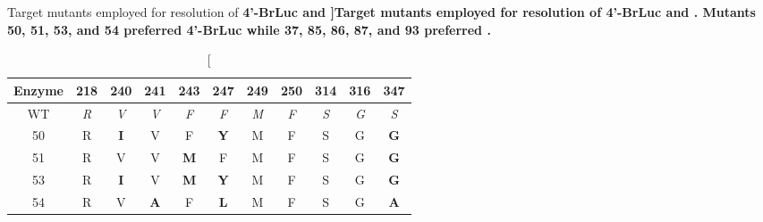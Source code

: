 \begin{table}[]
  \centering
  \caption[Target mutants employed for resolution of \bf{4'-BrLuc} and \dluc{}]{Target mutants employed for resolution of \bf{4'-BrLuc} and \dluc{}. Mutants 50, 51, 53, and 54 preferred \bf{4'-BrLuc} while 37, 85, 86, 87, and 93 preferred \dluc{}.
  }\label{table:Mutants}
  \begin{tabular}{@{}c | cccccccccc@{}}
  \toprule
  Enzyme & 218                               & 240                               & 241                               & 243                               & 247                               & 249                               & 250                               & 314                               & 316                               & 347                               \\ \midrule
  WT     & \textit{R}                        & \textit{V}                        & \textit{V}                        & \textit{F}                        & \textit{F}                        & \textit{M}                        & \textit{F}                        & \textit{S}                        & \textit{G}                        & \textit{S}                        \\
  50     & {\color[HTML]{333333} R}          & {\color[HTML]{FE0000} \textbf{I}} & {\color[HTML]{333333} V}          & {\color[HTML]{333333} F}          & {\color[HTML]{FE0000} \textbf{Y}} & {\color[HTML]{333333} M}          & {\color[HTML]{333333} F}          & {\color[HTML]{333333} S}          & {\color[HTML]{333333} G}          & {\color[HTML]{FE0000} \textbf{G}} \\
  51     & {\color[HTML]{333333} R}          & {\color[HTML]{333333} V}          & {\color[HTML]{333333} V}          & {\color[HTML]{FE0000} \textbf{M}} & {\color[HTML]{333333} F}          & {\color[HTML]{333333} M}          & {\color[HTML]{333333} F}          & {\color[HTML]{333333} S}          & {\color[HTML]{333333} G}          & {\color[HTML]{FE0000} \textbf{G}} \\
  53     & {\color[HTML]{333333} R}          & {\color[HTML]{FE0000} \textbf{I}} & {\color[HTML]{333333} V}          & {\color[HTML]{FE0000} \textbf{M}} & {\color[HTML]{FE0000} \textbf{Y}} & {\color[HTML]{333333} M}          & {\color[HTML]{333333} F}          & {\color[HTML]{333333} S}          & {\color[HTML]{333333} G}          & {\color[HTML]{FE0000} \textbf{G}} \\
  54     & {\color[HTML]{333333} R}          & {\color[HTML]{333333} V}          & {\color[HTML]{FE0000} \textbf{A}} & {\color[HTML]{333333} F}          & {\color[HTML]{FE0000} \textbf{L}} & {\color[HTML]{333333} M}          & {\color[HTML]{333333} F}          & {\color[HTML]{333333} S}          & {\color[HTML]{333333} G}          & {\color[HTML]{FE0000} \textbf{A}} \\\midrule

\end{tabular}
\end{table}
